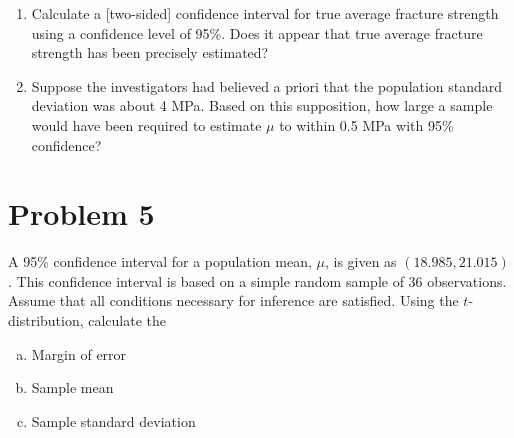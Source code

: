 \documentclass[11pt,twoside]{article}
\newcommand{\pts}[1]{\marginpar{ \small\hspace{0pt} \textit{[#1]} } }
\numberwithin{equation}{section}
\newcommand{\?}{\stackrel{?}{=}}
\begin{document}
\begin{enumerate}[\bf (a)]
\item Calculate a [two-sided] confidence interval for true average \pts{4} fracture strength using a confidence level of 95\%.
  Does it appear that true average fracture strength has been precisely estimated?
  \vspace{40ex}
  
  
\item Suppose the \pts{3} investigators had believed a priori that the population standard deviation was about 4 MPa.
  Based on this supposition, how large a sample would have been required to estimate $\mu$ to within 0.5 MPa with 95\% confidence?
  \vspace{50ex}
 
\end{enumerate}

\eject
\section*{Problem 5       }
A 95\% confidence interval for a population mean, $\mu$, is given as $(18.985,
21.015)$. This confidence interval is based on a simple random sample of 36 observations.
Assume that all conditions necessary for inference are satisfied. Using the $t$-distribution, calculate the
\begin{enumerate}[(a)]

  \item Margin of error \pts{1}
  \vspace{15ex}
\item Sample mean \pts{1}
\vspace{15ex}
 
\item Sample standard deviation \pts{3}
\vspace{40ex}
 
\end{enumerate}
\eject
\end{document}
